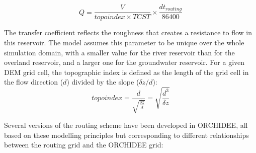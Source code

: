 \begin{equation}
    Q = \frac{V}{topoindex \times TCST} \times \frac{dt_{routing}}{86400}
\end{equation}

The transfer coefficient reflects the roughness that creates a resistance to flow in this reservoir. The model assumes this parameter to be unique over the whole simulation domain, with a smaller value for the river reservoir than for the overland reservoir, and a larger one for the groundwater reservoir.
For a given DEM grid cell, the topographic index is defined as the length of the grid cell in the flow direction ($d$) divided by the slope ($\delta z / d$):
\begin{equation}
    topoindex = \frac{d}{\sqrt{\frac{\delta z}{d}}} = \sqrt{ \frac{d^3}{\delta z} } 
\end{equation}

Several versions of the routing scheme have been developed in ORCHIDEE, all based on these modelling principles but corresponding to different relationships between the routing grid and the ORCHIDEE grid:

